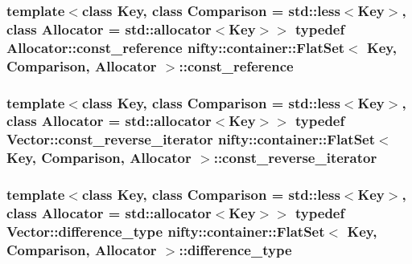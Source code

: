 \subsubsection[{const\+\_\+reference}]{\setlength{\rightskip}{0pt plus 5cm}template$<$class Key, class Comparison = std\+::less$<$\+Key$>$, class Allocator = std\+::allocator$<$\+Key$>$$>$ typedef Allocator\+::const\+\_\+reference {\bf nifty\+::container\+::\+Flat\+Set}$<$ Key, Comparison, Allocator $>$\+::{\bf const\+\_\+reference}}\label{classnifty_1_1container_1_1FlatSet_a9fc6932b53d6a86ec15830e31805f8d4}
\hypertarget{classnifty_1_1container_1_1FlatSet_ab7858d2e6eeeb311e21988d9b4a5b802}{}
\subsubsection[{const\+\_\+reverse\+\_\+iterator}]{\setlength{\rightskip}{0pt plus 5cm}template$<$class Key, class Comparison = std\+::less$<$\+Key$>$, class Allocator = std\+::allocator$<$\+Key$>$$>$ typedef Vector\+::const\+\_\+reverse\+\_\+iterator {\bf nifty\+::container\+::\+Flat\+Set}$<$ Key, Comparison, Allocator $>$\+::{\bf const\+\_\+reverse\+\_\+iterator}}\label{classnifty_1_1container_1_1FlatSet_ab7858d2e6eeeb311e21988d9b4a5b802}
\hypertarget{classnifty_1_1container_1_1FlatSet_a84e65d3e380dc5d376c9176780333700}{}
\subsubsection[{difference\+\_\+type}]{\setlength{\rightskip}{0pt plus 5cm}template$<$class Key, class Comparison = std\+::less$<$\+Key$>$, class Allocator = std\+::allocator$<$\+Key$>$$>$ typedef Vector\+::difference\+\_\+type {\bf nifty\+::container\+::\+Flat\+Set}$<$ Key, Comparison, Allocator $>$\+::{\bf difference\+\_\+type}}\label{classnifty_1_1container_1_1FlatSet_a84e65d3e380dc5d376c9176780333700}
\hypertarget{classnifty_1_1container_1_1FlatSet_a9c7fd20cd6b1878ccb8a7e068072c795}{}
